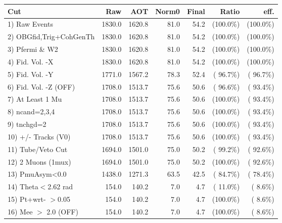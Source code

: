  \begin{table}[h!]\centering
 \begin{tabular}{||l||r|r|r|r|r|r||}
 \hline
 \hline
 Cut & Raw & AOT & Norm0 & Final & Ratio & eff.       \\
 \hline
  1) Raw Events           &       1830.0 &       1620.8 &         81.0 &         54.2 & (100.0\%) & (100.0\%) \\
  2) OBGfid,Trig+CohGenTh &       1830.0 &       1620.8 &         81.0 &         54.2 & (100.0\%) & (100.0\%) \\
  3) Pfermi \& W2         &       1830.0 &       1620.8 &         81.0 &         54.2 & (100.0\%) & (100.0\%) \\
  4) Fid. Vol. -X         &       1830.0 &       1620.8 &         81.0 &         54.2 & (100.0\%) & (100.0\%) \\
  5) Fid. Vol. -Y         &       1771.0 &       1567.2 &         78.3 &         52.4 & ( 96.7\%) & ( 96.7\%) \\
  6) Fid. Vol. -Z (OFF)   &       1708.0 &       1513.7 &         75.6 &         50.6 & ( 96.6\%) & ( 93.4\%) \\
  7) At Least 1 Mu        &       1708.0 &       1513.7 &         75.6 &         50.6 & (100.0\%) & ( 93.4\%) \\
  8) ncand=2,3,4          &       1708.0 &       1513.7 &         75.6 &         50.6 & (100.0\%) & ( 93.4\%) \\
  9) tnchgd=2             &       1708.0 &       1513.7 &         75.6 &         50.6 & (100.0\%) & ( 93.4\%) \\
 10) +/- Tracks (V0)      &       1708.0 &       1513.7 &         75.6 &         50.6 & (100.0\%) & ( 93.4\%) \\
 11) Tube/Veto Cut        &       1694.0 &       1501.0 &         75.0 &         50.2 & ( 99.2\%) & ( 92.6\%) \\
 12) 2 Muons (1mux)       &       1694.0 &       1501.0 &         75.0 &         50.2 & (100.0\%) & ( 92.6\%) \\
 13) PmuAsym<0.0          &       1438.0 &       1271.3 &         63.5 &         42.5 & ( 84.7\%) & ( 78.4\%) \\
 14) Theta$<$2.62 rad     &        154.0 &        140.2 &          7.0 &          4.7 & ( 11.0\%) & (  8.6\%) \\
 15) Pt+wrt- $>$0.05      &        154.0 &        140.2 &          7.0 &          4.7 & (100.0\%) & (  8.6\%) \\
 16) Mee $>$ 2.0  (OFF)   &        154.0 &        140.2 &          7.0 &          4.7 & (100.0\%) & (  8.6\%) \\

\end{tabular}
\end{table}
